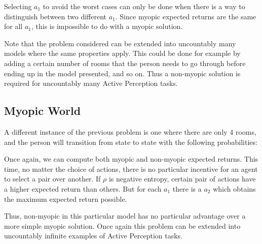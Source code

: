 Selecting $a_1$ to avoid the worst cases can only be done when there is a way to distinguish between
two different $a_1$.  Since myopic expected returns are the same for all $a_1$, this is impossible
to do with a myopic solution.

Note that the problem considered can be extended into uncountably many models where the same
properties apply. This could be done for example by adding a certain number of rooms that the person
needs to go through before ending up in the model presented, and so on. Thus a non-myopic solution
is required for uncountably many Active Perception tasks.

\subsection{Myopic World}

A different instance of the previous problem is one where there are only 4 rooms, and the person
will transition from state to state with the following probabilities:

\begin{center}
\end{center}

Once again, we can compute both myopic and non-myopic expected returns. This time, no matter the
choice of actions, there is no particular incentive for an agent to select a pair over another. If
$\rho$ is negative entropy, certain pair of actions have a higher expected return than others. But
for each $a_1$ there is a $a_2$ which obtains the maximum expected return possible.

Thus, non-myopic in this particular model has no particular advantage over a more simple myopic
solution. Once again this problem can be extended into uncountably infinite examples of Active
Perception tasks.


